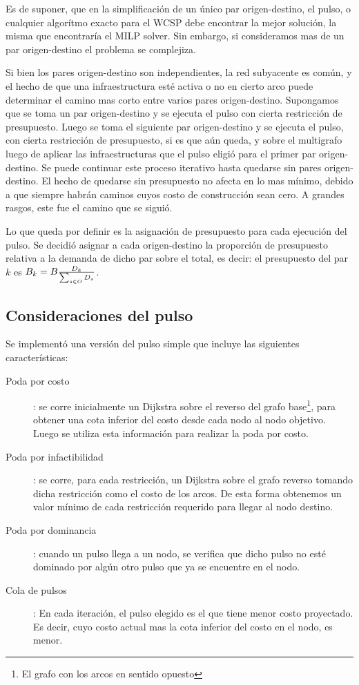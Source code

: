 \documentclass{article}
\begin{document}
  Es de suponer, que en la simplificación de un único par origen-destino, el pulso, o cualquier algorítmo exacto para el WCSP debe encontrar la mejor solución, la misma que encontraría el MILP solver. Sin embargo, si consideramos mas de un par origen-destino el problema se complejiza.

  Si bien los pares origen-destino son independientes, la red subyacente es común, y el hecho de que una infraestructura esté activa o no en cierto arco puede determinar el camino mas corto entre varios pares origen-destino. Supongamos que se toma un par origen-destino y se ejecuta el pulso con cierta restricción de presupuesto. Luego se toma el siguiente par origen-destino y se ejecuta el pulso, con cierta restricción de presupuesto, si es que aún queda, y sobre el multigrafo luego de aplicar las infraestructuras que el pulso eligió para el primer par origen-destino. Se puede continuar este proceso iterativo hasta quedarse sin pares origen-destino. El hecho de quedarse sin presupuesto no afecta en lo mas mínimo, debido a que siempre habrán caminos cuyos costo de construcción sean cero. A grandes rasgos, este fue el camino que se siguió.

  Lo que queda por definir es la asignación de presupuesto para cada ejecución del pulso. Se decidió asignar a cada origen-destino la proporción de presupuesto relativa a la demanda de dicho par sobre el total, es decir: el presupuesto del par $k$ es $B_k = B  {D_k \over \sum_{s \in O} D_s}$.

  \subsection*{Consideraciones del pulso}

  Se implementó una versión del pulso simple que incluye las siguientes características:

  \begin{description}
    \item[Poda por costo]: {se corre inicialmente un Dijkstra sobre el reverso del grafo base\footnote{El grafo con los arcos en sentido opuesto}, para obtener una cota inferior del costo desde cada nodo al nodo objetivo. Luego se utiliza esta información para realizar la poda por costo.}
    \item[Poda por infactibilidad]: {se corre, para cada restricción, un Dijkstra sobre el grafo reverso tomando dicha restricción como el costo de los arcos. De esta forma obtenemos un valor mínimo de cada restricción requerido para llegar al nodo destino.}
    \item[Poda por dominancia]: {cuando un pulso llega a un nodo, se verifica que dicho pulso no esté dominado por algún otro pulso que ya se encuentre en el nodo.}
    \item[Cola de pulsos]: {En cada iteración, el pulso elegido es el que tiene menor costo proyectado. Es decir, cuyo costo actual mas la cota inferior del costo en el nodo, es menor.}
  \end{description}
\end{document}
